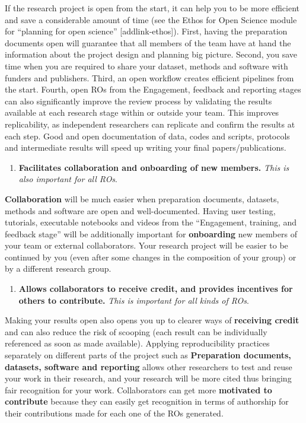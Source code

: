 \documentclass[
  letterpaper,
  DIV=11,
  numbers=noendperiod]{scrreport}
\providecommand{\tightlist}{%
  \setlength{\itemsep}{0pt}\setlength{\parskip}{0pt}}\usepackage{longtable,booktabs,array}
\begin{document}
If the research project is open from the start, it can help you to be
more efficient and save a considerable amount of time (see the Ethos for
Open Science module for ``planning for open science''
{[}addlink-ethos{]}). First, having the preparation documents open will
guarantee that all members of the team have at hand the information
about the project design and planning big picture. Second, you save time
when you are required to share your dataset, methods and software with
funders and publishers. Third, an open workflow creates efficient
pipelines from the start. Fourth, open ROs from the Engagement, feedback
and reporting stages can also significantly improve the review process
by validating the results available at each research stage within or
outside your team. This improves replicability, as independent
researchers can replicate and confirm the results at each step. Good and
open documentation of data, codes and scripts, protocols and
intermediate results will speed up writing your final
papers/publications.

\begin{enumerate}
\def\labelenumi{\arabic{enumi}.}
\tightlist
\item
  \textbf{Facilitates collaboration and onboarding of new members.}
  \emph{This is also important for all ROs}.
\end{enumerate}

\textbf{Collaboration} will be much easier when preparation documents,
datasets, methods and software are open and well-documented. Having user
testing, tutorials, executable notebooks and videos from the
``Engagement, training, and feedback stage'' will be additionally
important for \textbf{onboarding} new members of your team or external
collaborators. Your research project will be easier to be continued by
you (even after some changes in the composition of your group) or by a
different research group.

\begin{enumerate}
\def\labelenumi{\arabic{enumi}.}
\tightlist
\item
  \textbf{Allows collaborators to receive credit, and provides
  incentives for others to contribute.} \emph{This is important for all
  kinds of ROs}.
\end{enumerate}

Making your results open also opens you up to clearer ways of
\textbf{receiving credit} and can also reduce the risk of scooping (each
result can be individually referenced as soon as made available).
Applying reproducibility practices separately on different parts of the
project such as \textbf{Preparation documents, datasets, software and
reporting} allows other researchers to test and reuse your work in their
research, and your research will be more cited thus bringing fair
recognition for your work. Collaborators can get more \textbf{motivated
to contribute} because they can easily get recognition in terms of
authorship for their contributions made for each one of the ROs
generated.
\end{document}
